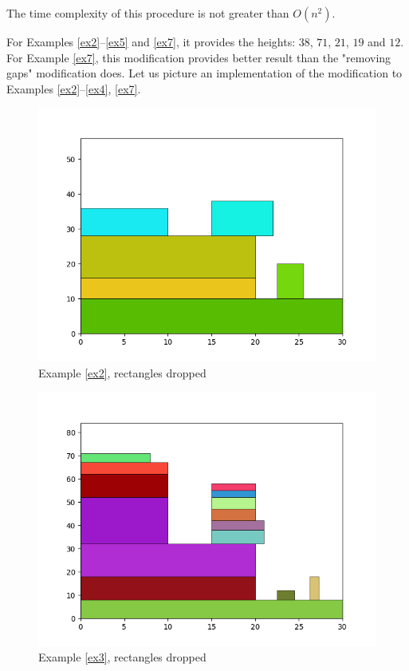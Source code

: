 \documentclass{article}
\theoremstyle{definition}
\theoremstyle{theorem}
\numberwithin{proposition}{section}
\begin{document}
        The time complexity of this procedure is not greater than $O(n^2)$. 

        For Examples \ref{ex2}--\ref{ex5} and \ref{ex7}, it provides the heights: $38$, $71$, $21$, $19$ and $12$. For Example \ref{ex7}, this modification provides better result than the "removing gaps" modification does. Let us picture an implementation of the modification to Examples \ref{ex2}--\ref{ex4}, \ref{ex7}.
        \begin{figure}[H]
            \centering
            \includegraphics[scale=0.5]{../examples/dropped-2.png}
            \caption{Example \ref{ex2}, rectangles dropped}
        \end{figure}
        \begin{figure}[H]
            \centering
            \includegraphics[scale=0.5]{../examples/dropped-3.png}
            \caption{Example \ref{ex3}, rectangles dropped}
        \end{figure}
\end{document}
